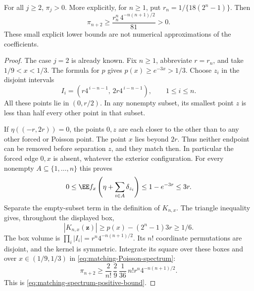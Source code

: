 \documentclass[11pt,letterpaper]{article}
\begin{document}
\begin{theorem}
\label{thm:matching-spectrum-positive}
For all $j\ge2$, $\pi_j>0$.
More explicitly, for $n\ge1$, put
$r_n=1/\{18(2^n-1)\}$. Then
\begin{equation}\label{eq:matching-spectrum-positive-bound}
 \pi_{n+2}\ge
       \frac{r_n^n\,4^{-n(n+1)/2}}{81}>0.
\end{equation}
These small explicit lower bounds are not numerical
approximations of the coefficients.
\end{theorem}
\begin{proof}
The case $j=2$ is already known.
Fix $n\ge1$, abbreviate $r=r_n$, and take
$1/9<x<1/3$. The formula for $p$ gives
$p(x)\ge e^{-3x}>1/3$.
Choose $z_i$ in the disjoint intervals
\[
 I_i=(r4^{\,i-n-1},\,2r4^{\,i-n-1}),
                         \qquad 1\le i\le n.
\]
All these points lie in $(0,r/2)$. In any nonempty subset,
its smallest point $z$ is less than half every other point
in that subset.

If $\eta((-r,2r))=0$, the points $0,z$ are each closer to
the other than to any other forced or Poisson point.
The point $x$ lies beyond $2r$.
Thus neither endpoint can be removed before separation $z$,
and they match then. In particular the forced edge $0,x$
is absent, whatever the exterior configuration.
For every nonempty $A\subseteq\{1,\ldots,n\}$ this proves
\[
 0\le\EE f_x\left(\eta+\sum_{i\in A}\delta_{z_i}\right)
                  \le1-e^{-3r}\le3r.
\]
Separate the empty-subset term in the definition of $K_{n,x}$.
The triangle inequality gives, throughout the displayed box,
\[
 |K_{n,x}(\boldsymbol z)|
       \ge p(x)-(2^n-1)3r\ge1/6.
\]
The box volume is
$\prod_i|I_i|=r^n4^{-n(n+1)/2}$.
Its $n!$ coordinate permutations are disjoint, and the kernel
is symmetric. Integrate its square over these boxes and over
$x\in(1/9,1/3)$ in \eqref{eq:matching-Poisson-spectrum}:
\[
 \pi_{n+2}\ge
 \frac2{n!}\,\frac29\,\frac1{36}\,
       n!r^n4^{-n(n+1)/2}.
\]
This is \eqref{eq:matching-spectrum-positive-bound}.
\end{proof}
\end{document}

